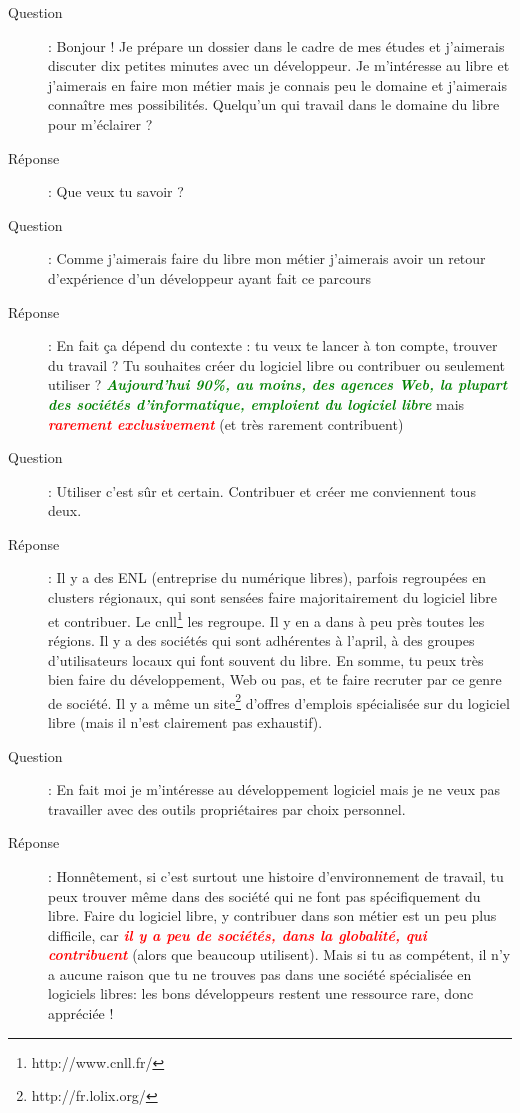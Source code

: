 \documentclass[a4paper,12pt, draft]{report}
\newcommand{\goodPoint}[1]{\textcolor{green}{\textbf{\textit{#1}}}}
\newcommand{\badPoint}[1]{\textcolor{red}{\textbf{\textit{#1}}}}
\begin{document}
\begin{description}
\item [Question]:  Bonjour ! Je prépare un dossier dans le cadre de mes études et j'aimerais discuter dix petites minutes avec un développeur. Je m'intéresse au libre et j'aimerais en faire mon métier mais je connais peu le domaine et j'aimerais connaître mes possibilités. Quelqu'un qui travail dans le domaine du libre pour m'éclairer ?
\item [Réponse]:  Que veux tu savoir ?
\item [Question]:  Comme j'aimerais faire du libre mon métier j'aimerais avoir un retour d'expérience d'un développeur ayant fait ce parcours
\item [Réponse]:  En fait ça dépend du contexte : tu veux te lancer à ton compte, trouver du travail ? Tu souhaites créer du logiciel libre ou contribuer ou seulement utiliser ? \goodPoint{Aujourd'hui 90\%, au moins, des agences Web, la plupart des sociétés d'informatique, emploient du logiciel libre} mais \badPoint{rarement exclusivement} (et très rarement contribuent)
\item [Question]:  Utiliser c'est sûr et certain. Contribuer et créer me conviennent tous deux.
\item [Réponse]:  Il y a des ENL (entreprise du numérique libres), parfois regroupées en clusters régionaux, qui sont sensées faire majoritairement du logiciel libre et contribuer. Le cnll\footnote{http://www.cnll.fr/} les regroupe. Il y en a dans à peu près toutes les régions. Il y a des sociétés qui sont adhérentes à l'april, à des groupes d'utilisateurs locaux qui font souvent du libre. En somme, tu peux très bien faire du développement, Web ou pas, et te faire recruter par ce genre de société. Il y a même un site\footnote{http://fr.lolix.org/} d'offres d'emplois spécialisée sur du logiciel libre (mais il n'est clairement pas exhaustif).
\item [Question]:  En fait moi je m'intéresse au développement logiciel mais je ne veux pas travailler avec des outils propriétaires par choix personnel.
\item [Réponse]:  Honnêtement, si c'est surtout une histoire d'environnement de travail, tu peux trouver même dans des société qui ne font pas spécifiquement du libre. Faire du logiciel libre, y contribuer dans son métier est un peu plus difficile, car \badPoint{il y a peu de sociétés, dans la globalité, qui contribuent} (alors que beaucoup utilisent). Mais si tu as compétent, il n'y a aucune raison que tu ne trouves pas dans une société spécialisée en logiciels libres: les bons développeurs restent une ressource rare, donc appréciée !

\end{description}
\end{document}

